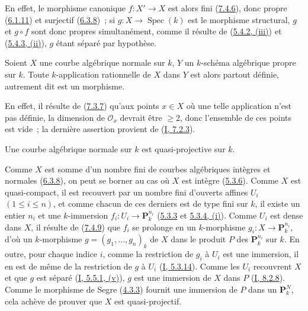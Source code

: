 En effet, le morphisme canonique $f:X'\to X$ est alors fini
(\hyperref[II.7.4.6-fr]{7.4.6}), donc propre
(\hyperref[II.6.1.11-fr]{6.1.11}) et surjectif
(\hyperref[II.6.3.8-fr]{6.3.8})~; si $g:X\to\operatorname{Spec}(k)$ est le
morphisme structural, $g$ et $g\circ f$ sont donc propres simultanément,
comme il résulte de (\hyperref[II.5.4.2-fr]{5.4.2, (iii)}) et
(\hyperref[II.5.4.3-fr]{5.4.3, (ii)}), $g$ étant séparé par hypothèse.

\begin{proposition}[7.4.9]
\label{II.7.4.9-fr}
Soient $X$ une courbe algébrique normale sur $k$, $Y$ un $k$-schéma algébrique
propre sur $k$. Toute $k$-application rationnelle de $X$ dans $Y$ est alors
partout définie, autrement dit est un morphisme.
\end{proposition}

En effet, il résulte de (\hyperref[II.7.3.7-fr]{7.3.7}) qu'aux points $x\in X$
où une telle application n'est pas définie, la dimension de $\mathcal{O}_x$
devrait être $\geq2$, donc l'ensemble de ces points est vide~; la dernière
assertion provient de (\hyperref[I.7.2.3-fr]{I, 7.2.3}).

\begin{corollary}[7.4.10]
\label{II.7.4.10-fr}
Une courbe algébrique normale sur $k$ est quasi-projective sur $k$.
\end{corollary}

Comme $X$ est somme d'un nombre fini de courbes algébriques intègres et
normales (\hyperref[II.6.3.8-fr]{6.3.8}), on peut se borner au cas où $X$ est
intègre (\hyperref[II.5.3.6-fr]{5.3.6}). Comme $X$ est quasi-compact, il est
recouvert par un nombre fini d'ouverts affines $U_i$ $(1\leq i\leq n)$, et
comme chacun de ces derniers est de type fini sur $k$, il existe un entier
$n_i$ et une $k$-immersion $f_i:U_i\to\mathbf{P}_k^{n_i}$
(\hyperref[II.5.3.3-fr]{5.3.3} et
\hyperref[II.5.3.4-fr]{5.3.4, (i)}). Comme $U_i$ est dense dans $X$, il résulte
de (\hyperref[II.7.4.9-fr]{7.4.9}) que $f_i$ se prolonge en un $k$-morphisme
$g_i:X\to\mathbf{P}_k^{n_i}$, d'où un $k$-morphisme
$g=(g_1,\ldots,g_n)_k$ de $X$ dans le produit $P$ des
$\mathbf{P}_k^{n_i}$ sur $k$. En outre, pour chaque indice $i$, comme la
restriction de $g_i$ à $U_i$ est une immersion, il en est de même de la
restriction de $g$ à $U_i$ (\hyperref[I.5.3.14-fr]{I, 5.3.14}). Comme les
$U_i$ recouvrent $X$ et que $g$ est séparé
(\hyperref[I.5.5.1-fr]{I, 5.5.1, (v)}), $g$ est une immersion de $X$ dans $P$
(\hyperref[I.8.2.8-fr]{I, 8.2.8}). Comme le morphisme de Segre
(\hyperref[II.4.3.3-fr]{4.3.3}) fournit une immersion de $P$ dans un
$\mathbf{P}_k^N$, cela achève de prouver que $X$ est quasi-projectif.

